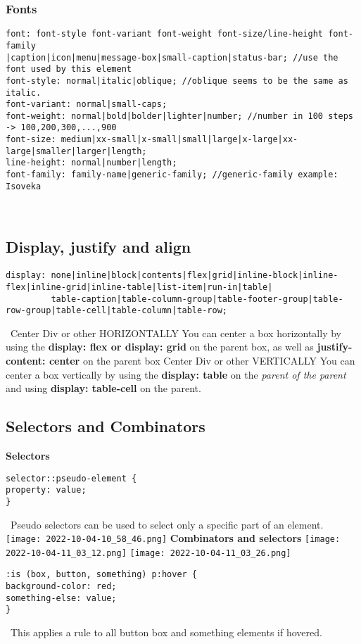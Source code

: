 \documentclass[main.tex,fontsize=6pt,paper=a4,paper=landscape,DIV=calc,]{scrartcl}
\begin{document}
\begin{multicols*}{4}
\subsubsection{Fonts}
\begin{lstlisting}
font: font-style font-variant font-weight font-size/line-height font-family
|caption|icon|menu|message-box|small-caption|status-bar; //use the font used by this element
font-style: normal|italic|oblique; //oblique seems to be the same as italic.
font-variant: normal|small-caps;
font-weight: normal|bold|bolder|lighter|number; //number in 100 steps -> 100,200,300,...,900
font-size: medium|xx-small|x-small|small|large|x-large|xx-large|smaller|larger|length;
line-height: normal|number|length;
font-family: family-name|generic-family; //generic-family example: Isoveka
\end{lstlisting}
\, \newline

\subsection{Display, justify and align}
\begin{lstlisting}
display: none|inline|block|contents|flex|grid|inline-block|inline-flex|inline-grid|inline-table|list-item|run-in|table|
         table-caption|table-column-group|table-footer-group|table-row-group|table-cell|table-column|table-row;
\end{lstlisting}
\, \newline
Center Div or other HORIZONTALLY \newline 
You can center a box horizontally by using the \textbf{display: flex or display: grid} on the parent box, as well as \textbf{justify-content: center} on the parent box\newline
Center Div or other VERTICALLY \newline 
You can center a box vertically by using the \textbf{display: table} on the \emph{parent of the parent} and using \textbf{display: table-cell} on the parent. 

\subsection{Selectors and Combinators}
\textbf{Selectors}
\begin{lstlisting}
selector::pseudo-element {
property: value;
}
\end{lstlisting}
\, \newline
 Pseudo selectors can be used to select only a specific part of an element.
\texttt{[image: 2022-10-04-10\_58\_46.png]}
\textbf{Combinators and selectors}  
\texttt{[image: 2022-10-04-11\_03\_12.png]}\newline 
\texttt{[image: 2022-10-04-11\_03\_26.png]}
\begin{lstlisting}
:is (box, button, something) p:hover {
background-color: red;
something-else: value;
}
\end{lstlisting}
\, \newline
 This applies a rule to all button box and something elements if hovered.


\end{multicols*}
\end{document}
